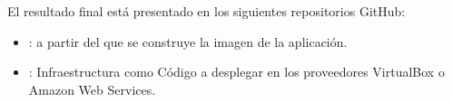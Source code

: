 El resultado final está presentado en los siguientes repositorios GitHub:
\begin{itemize}
\item {}: a partir del que se construye la imagen de la aplicación.
\item {}: Infraestructura como Código a desplegar en los proveedores VirtualBox o Amazon Web Services.
\end{itemize}

